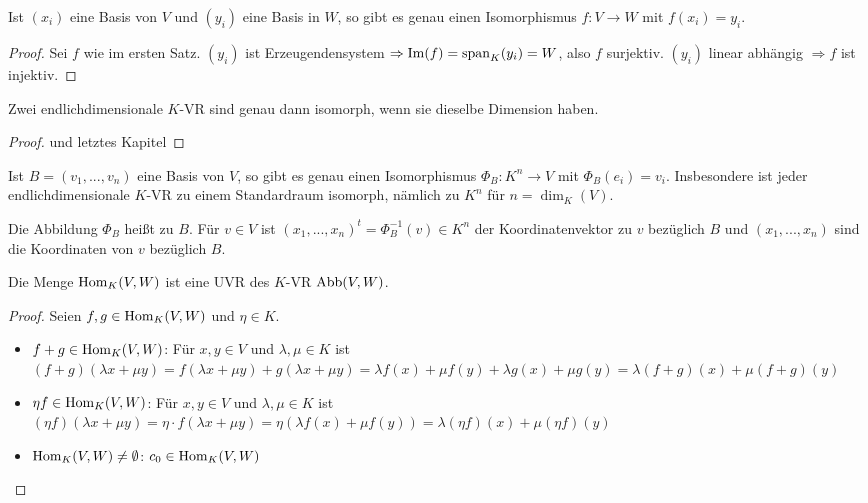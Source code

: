 \begin{conclusion}
	Ist $(x_i)$ eine Basis von $V$ und $(y_i)$ eine Basis in $W$, so gibt es genau einen Isomorphismus 
	$f:V\to W$ mit $f(x_i)=y_i$.
\end{conclusion}
\begin{proof}
	Sei $f$ wie im ersten Satz. $(y_i)$ ist Erzeugendensystem $\Rightarrow \operatorname{Im}(f)=\operatorname{span}_K(y_i)=W$, also $f$ surjektiv. 
	$(y_i)$ linear abhängig $\Rightarrow f$ ist injektiv.
\end{proof}

\begin{conclusion}
	Zwei endlichdimensionale $K$-VR sind genau dann isomorph, wenn sie dieselbe Dimension haben.
\end{conclusion}
\begin{proof}
	 und letztes Kapitel
\end{proof}

\begin{conclusion}
	Ist $B=(v_1,...,v_n)$ eine Basis von $V$, so gibt es genau einen Isomorphismus $\Phi_B:K^n\to 
	V$ mit $\Phi_B(e_i)=v_i$. Insbesondere ist jeder endlichdimensionale $K$-VR zu einem Standardraum isomorph, nämlich zu
	$K^n$ für $n=\dim_K(V)$.
\end{conclusion}

\begin{definition}[Koordinatensystem]
	Die Abbildung $\Phi_B$ heißt  zu $B$. Für $v\in V$ ist 
	$(x_1,...,x_n)^t=\Phi^{-1}_B(v)\in K^n$ der Koordinatenvektor zu $v$ bezüglich $B$ und $(x_1,...,x_n)$ sind die 
	Koordinaten von $v$ bezüglich $B$.
\end{definition}

\begin{proposition}
	Die Menge $\operatorname{Hom}_K(V,W)$ ist eine UVR des $K$-VR $\operatorname{Abb}(V,W)$.
\end{proposition}
\begin{proof}
	Seien $f,g\in \operatorname{Hom}_K(V,W)$ und $\eta \in K$.
	\begin{itemize}
		\item $f+g\in \operatorname{Hom}_K(V,W)$: Für $x,y\in V$ und $\lambda,\mu\in K$ ist $(f+g)(\lambda x+\mu y)=f(\lambda x+\mu y)+
		g(\lambda x+\mu y)=\lambda f(x)+\mu f(y)+\lambda g(x)+\mu g(y)=\lambda(f+g)(x)+\mu(f+g)(y)$
		\item $\eta f\in \operatorname{Hom}_K(V,W)$: Für $x,y\in V$ und $\lambda,\mu\in K$ ist $(\eta f)(\lambda x+\mu y)=\eta\cdot 
		f(\lambda x+\mu y)=\eta(\lambda f(x)+\mu f(y))=\lambda(\eta f)(x)+\mu(\eta f)(y)$
		\item $\operatorname{Hom}_K(V,W)\neq\emptyset$: $c_0\in \operatorname{Hom}_K(V,W)$
	\end{itemize}
\end{proof}

